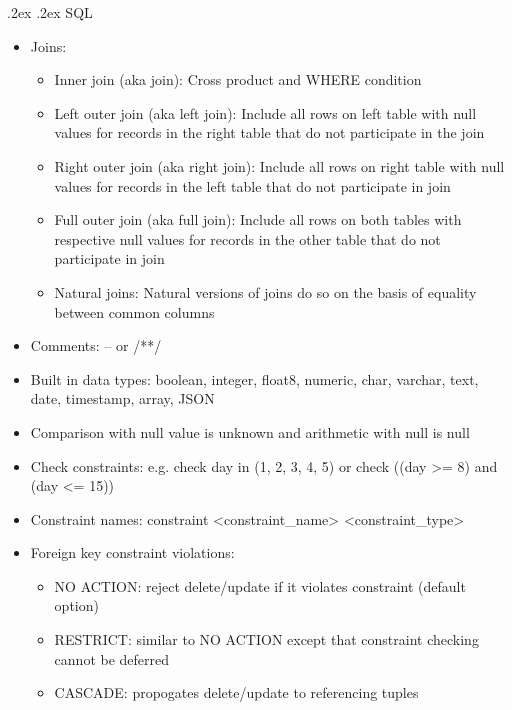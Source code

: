 \documentclass[10pt,landscape,a4paper]{scrartcl}
\makeatletter
\renewcommand{\section}{\@startsection{section}{1}{0mm}%
  {.2ex}%
  {.2ex}%
{\color{myblue}\sffamily\small\bfseries}}
\makeatother
\begin{document}
\setlength{\abovedisplayskip}{0pt}
\setlength{\belowdisplayskip}{0pt}


\scriptsize
\begin{multicols*}{4}
  \raggedcolumns
  \section{SQL}
  \begin{itemize}
      \item Joins:
      \begin{itemize}
         \item Inner join (aka join): Cross product and WHERE condition
         \item Left outer join (aka left join): Include all rows on left table with null values for records in the right table that do not participate in the join
         \item Right outer join (aka right join): Include all rows on right table with null values for records in the left table that do not participate in join
         \item Full outer join (aka full join): Include all rows on both tables with respective null values for records in the other table that do not participate in join
         \item Natural joins: Natural versions of joins do so on the basis of equality between common columns 
     \end{itemize}
      \item Comments: -- or /**/
      \item Built in data types: boolean, integer, float8, numeric, char, varchar, text, date, timestamp, array, JSON
      \item Comparison with null value is unknown and arithmetic with null is null
      \item Check constraints: e.g. check day in (1, 2, 3, 4, 5) or check ((day >= 8) and (day <= 15))
      \item Constraint names: constraint <constraint\_name> <constraint\_type>
      \item Foreign key constraint violations:
      \begin{itemize}
          \item NO ACTION: reject delete/update if it violates constraint (default option)
          \item RESTRICT: similar to NO ACTION except that constraint checking cannot be deferred
          \item CASCADE: propogates delete/update to referencing tuples

\end{itemize}
\end{itemize}
\end{multicols*}
\end{document}
